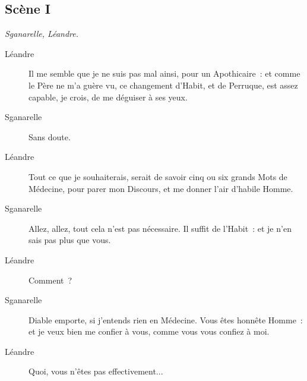 \documentclass[french,twoside]{book} %
\begin{document}
\subsection[{Scène I}]{Scène I}
\label{III01}
\textit{Sganarelle, Léandre.}\par
 \begin{description} \item[Léandre] 

Il me semble que je ne suis pas mal ainsi, pour un Apothicaire : et comme le Père ne m’a guère vu, ce changement d’Habit, et de Perruque, est assez capable, je crois, de me déguiser à ses yeux.\end{description}
 \begin{description} \item[Sganarelle] 

Sans doute.\end{description}
 \begin{description} \item[Léandre] 

Tout ce que je souhaiterais, serait de savoir cinq ou six grands Mots de Médecine, pour parer mon Discours, et me donner l’air d’habile Homme.\end{description}
 \begin{description} \item[Sganarelle] 

Allez, allez, tout cela n’est pas nécessaire. Il suffit de l’Habit : et je n’en sais pas plus que vous.\end{description}
 \begin{description} \item[Léandre] 

Comment ?\end{description}
 \begin{description} \item[Sganarelle] 

Diable emporte, si j’entends rien en Médecine. Vous êtes honnête Homme : et je veux bien me confier à vous, comme vous vous confiez à moi.\end{description}
 \begin{description} \item[Léandre] 

Quoi, vous n’êtes pas effectivement...\end{description}
\end{document}
